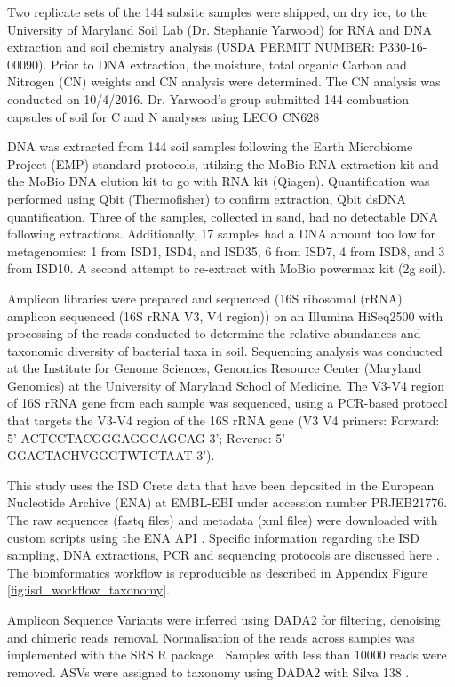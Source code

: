 Two replicate sets of the 144 subsite samples were shipped, on dry ice, to the
University of Maryland Soil Lab (Dr. Stephanie Yarwood) for RNA and DNA extraction
and soil chemistry analysis (USDA PERMIT NUMBER: P330-16-00090).
Prior to DNA extraction, the moisture, total organic Carbon and Nitrogen (CN) weights
and CN analysis were determined. The CN analysis was conducted on 10/4/2016.
Dr. Yarwood’s group submitted 144 combustion capsules of soil for C and N analyses using LECO CN628 

DNA was extracted from 144 soil samples following the Earth Microbiome Project (EMP)
standard protocols, utilzing the MoBio RNA extraction kit and the  MoBio DNA elution kit to go with RNA kit (Qiagen).
Quantification was performed using Qbit (Thermofisher) to confirm extraction, Qbit dsDNA
quantification. Three of the samples, collected in sand, had no detectable DNA
following extractions. Additionally, 17 samples had a DNA amount too low for metagenomics: 1 from ISD1, ISD4, and ISD35, 6 from ISD7, 4 from ISD8, and 3 from ISD10. A second attempt to re-extract with MoBio powermax kit (2g soil). 

Amplicon libraries were prepared and sequenced (16S ribosomal (rRNA) amplicon
sequenced (16S rRNA V3, V4 region)) on an Illumina HiSeq2500 with processing of
the reads conducted to determine the relative abundances and taxonomic diversity of bacterial taxa in soil.
Sequencing analysis was conducted at the Institute for Genome Sciences, Genomics
Resource Center (Maryland Genomics) at the University of Maryland School of Medicine.
The V3-V4 region of 16S rRNA gene from each sample was sequenced, using a
PCR-based protocol that targets the V3-V4 region of the 16S rRNA gene (V3 V4 primers: Forward: 5'-ACTCCTACGGGAGGCAGCAG-3'; Reverse: 5'-GGACTACHVGGGTWTCTAAT-3').

This study uses the ISD Crete data that have been deposited
in the European Nucleotide Archive (ENA) at EMBL-EBI under accession number PRJEB21776.
The raw sequences (fastq files) and metadata (xml files) were downloaded with custom scripts using the ENA API \parencite{Yuan2023}.
Specific information regarding the ISD sampling, DNA extractions, PCR and sequencing
protocols are discussed here \parencite{holm2024}. The bioinformatics workflow is 
reproducible as described in Appendix Figure \ref{fig:isd_workflow_taxonomy}.

Amplicon Sequence Variants were inferred using DADA2 \parencite{Callahan2016} for 
filtering, denoising and chimeric reads removal. Normalisation of the reads
across samples was implemented with the SRS R package \parencite{Beule2020}. Samples
with less than 10000 reads were removed. ASVs were assigned to taxonomy using 
DADA2 with Silva 138 \parencite{quast_silva_2013}.

